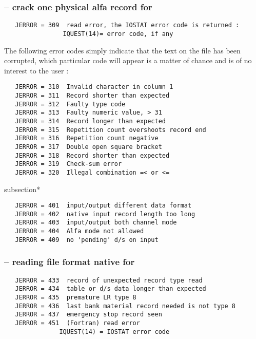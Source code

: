 \subsubsection{ -- crack one physical alfa record for }

\begin{verbatim}
   JERROR = 309  read error, the IOSTAT error code is returned :
                IQUEST(14)= error code, if any
\end{verbatim}

   The following error codes simply indicate that the text on the file
   has been corrupted, which particular code will appear is a matter
   of chance and is of no interest to the user :

\begin{verbatim}
   JERROR = 310  Invalid character in column 1
   JERROR = 311  Record shorter than expected
   JERROR = 312  Faulty type code
   JERROR = 313  Faulty numeric value, > 31
   JERROR = 314  Record longer than expected
   JERROR = 315  Repetition count overshoots record end
   JERROR = 316  Repetition count negative
   JERROR = 317  Double open square bracket
   JERROR = 318  Record shorter than expected
   JERROR = 319  Check-sum error
   JERROR = 320  Illegal combination =< or <=
\end{verbatim}

subsection*{}

\begin{verbatim}
   JERROR = 401  input/output different data format
   JERROR = 402  native input record length too long
   JERROR = 403  input/output both channel mode
   JERROR = 404  Alfa mode not allowed
   JERROR = 409  no 'pending' d/s on input
\end{verbatim}

\subsubsection*{ -- reading file format native for }

\begin{verbatim}
   JERROR = 433  record of unexpected record type read
   JERROR = 434  table or d/s data longer than expected
   JERROR = 435  premature LR type 8
   JERROR = 436  last bank material record needed is not type 8
   JERROR = 437  emergency stop record seen
   JERROR = 451  (Fortran) read error
               IQUEST(14) = IOSTAT error code
\end{verbatim}

